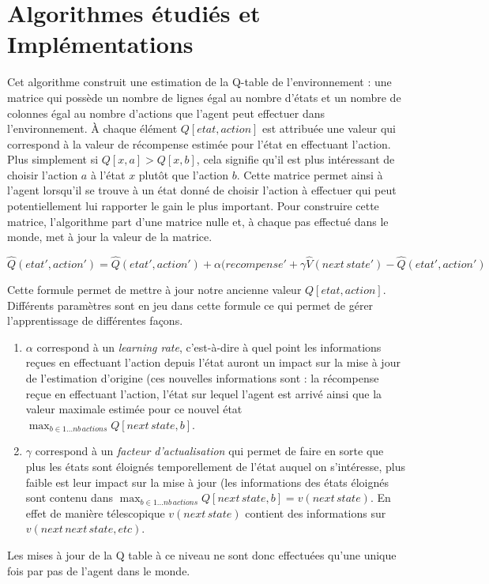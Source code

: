 \documentclass{article}
\begin{document}
\section{Algorithmes étudiés et Implémentations}
Cet algorithme construit une estimation de la Q-table de l’environnement : une matrice qui possède un nombre de lignes égal au nombre d’états et un nombre de colonnes égal au nombre d’actions que l’agent peut effectuer dans l’environnement. À chaque élément $Q[etat, action]$ est attribuée une valeur qui correspond à la valeur de récompense estimée pour l’état en effectuant l’action. Plus simplement si $Q[x,a] > Q[x,b]$, cela signifie qu’il est plus intéressant de choisir l’action $a$ à l’état $x$ plutôt que l’action $b$. 
Cette matrice permet ainsi à l’agent lorsqu’il se trouve à un état donné de choisir l’action à effectuer qui peut potentiellement lui rapporter le gain le plus important. Pour construire cette matrice, l’algorithme part d’une matrice nulle et, à chaque pas effectué dans le monde, met à jour la valeur de la matrice.

$$\hat{Q}(etat',action')=\hat{Q}(etat',action')+\alpha(recompense'+\gamma\hat{V}(next\,state')-\hat{Q}(etat',action')$$    %

Cette formule permet de mettre à jour notre ancienne valeur $Q[etat, action]$. Différents paramètres sont en jeu dans cette formule ce qui permet de gérer l’apprentissage de différentes façons. 
\begin{enumerate}
    \item $\alpha$ correspond à un \textit{learning rate}, c'est-à-dire à quel point les informations reçues en effectuant l’action depuis l’état auront un impact sur la mise à jour de l’estimation d’origine (ces nouvelles informations sont : la récompense reçue en effectuant l’action, l’état sur lequel l’agent est arrivé ainsi que la valeur maximale estimée pour ce nouvel état $\max_{b\in1...nb\,actions}Q[next\,state,b]$. 
    \item $\gamma$ correspond à un \textit{facteur d'actualisation} qui permet de faire en sorte que plus les états sont éloignés temporellement de l’état auquel on s’intéresse, plus faible est leur impact sur la mise à jour (les informations des états éloignés sont contenu dans $\max_{b\in1...nb\,actions}Q[next\,state,b]=v(next\,state)$. En effet de manière télescopique $v(next\,state)$ contient des informations sur $v(next\,next\,state, etc)$. 
\end{enumerate}

Les mises à jour de la Q table à ce niveau ne sont donc effectuées qu’une unique fois par pas de l’agent dans le monde. 
\end{document}
